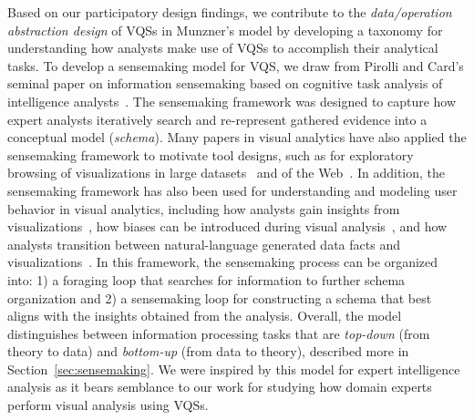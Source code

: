 {  %
  \par {}
  \npar Based on our participatory design findings, we contribute to the \textit{data/operation abstraction design} of VQSs in Munzner's model by developing a taxonomy for understanding how analysts make use of VQSs to accomplish their analytical tasks. To develop a sensemaking model for VQS, we draw from Pirolli and Card's seminal paper on information sensemaking based on cognitive task analysis of intelligence analysts~\cite{Pirolli}. The sensemaking framework was designed to capture how expert analysts iteratively search and re-represent gathered evidence into a conceptual model (\emph{schema}). Many papers in visual analytics have also applied the sensemaking framework to motivate tool designs, such as for exploratory browsing of visualizations in large datasets~\cite{Battle2016} and of the Web~\cite{Olston2003}. In addition, the sensemaking framework has also been used for understanding and modeling user behavior in visual analytics, including how analysts gain insights from visualizations~\cite{Yi2008}, how biases can be introduced during visual analysis~\cite{Wall2017}, and how analysts transition between natural-language generated data facts and visualizations~\cite{Srinivasan2019}. In this framework, the sensemaking process can be organized into: 1) a foraging loop that searches for information to further schema organization and 2) a sensemaking loop for constructing a schema that best aligns with the insights obtained from the analysis. Overall, the model distinguishes between information processing tasks that are \textit{top-down} (from theory to data) and \textit{bottom-up} (from data to theory), described more in Section~\ref{sec:sensemaking}. We were inspired by this model for expert intelligence analysis as it bears semblance to our work for studying how domain experts perform visual analysis using VQSs.
}
